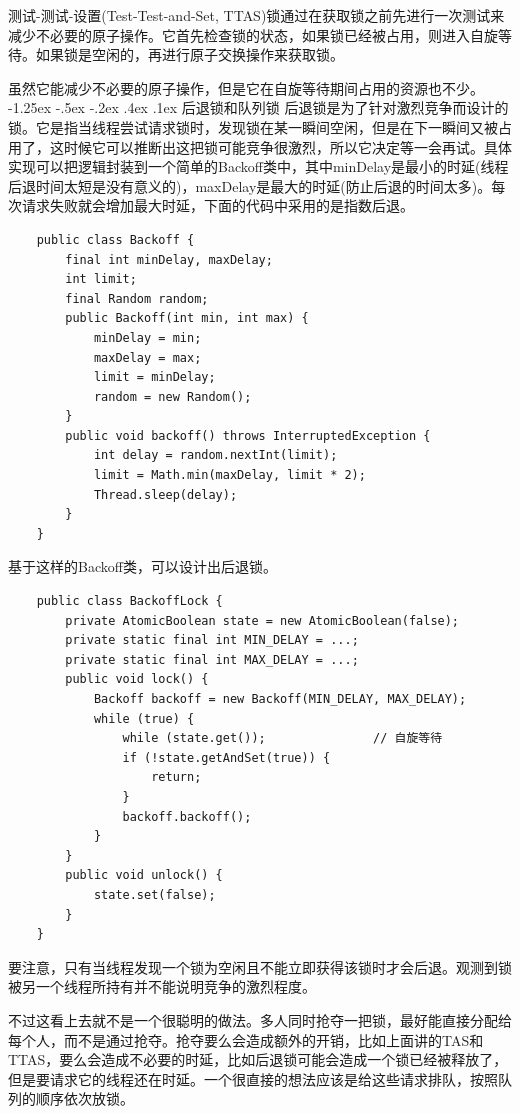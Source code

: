 \documentclass[a4paper, 11pt]{ctexart}
\makeatletter
\newcommand{\xiaosihao}{\fontsize{12pt}{\baselineskip}\selectfont}
\renewcommand\subsection{\@startsection{subsection}{1}{\z@}%
{-1.25ex \@plus -.5ex \@minus -.2ex}%
{.4ex \@plus .1ex}%
{\normalfont\xiaosihao\CJKfamily{hei}}}
\makeatother
\begin{document}
测试-测试-设置(Test-Test-and-Set, TTAS)锁通过在获取锁之前先进行一次测试来减少不必要的原子操作。它首先检查锁的状态，如果锁已经被占用，则进入自旋等待。如果锁是空闲的，再进行原子交换操作来获取锁。

虽然它能减少不必要的原子操作，但是它在自旋等待期间占用的资源也不少。
\subsection{后退锁和队列锁}
后退锁是为了针对激烈竞争而设计的锁。它是指当线程尝试请求锁时，发现锁在某一瞬间空闲，但是在下一瞬间又被占用了，这时候它可以推断出这把锁可能竞争很激烈，所以它决定等一会再试。具体实现可以把逻辑封装到一个简单的Backoff类中，其中minDelay是最小的时延(线程后退时间太短是没有意义的)，maxDelay是最大的时延(防止后退的时间太多)。每次请求失败就会增加最大时延，下面的代码中采用的是指数后退。
\begin{lstlisting}
    public class Backoff {
        final int minDelay, maxDelay;
        int limit;
        final Random random;
        public Backoff(int min, int max) {
            minDelay = min;
            maxDelay = max;
            limit = minDelay;
            random = new Random();
        }
        public void backoff() throws InterruptedException {
            int delay = random.nextInt(limit);
            limit = Math.min(maxDelay, limit * 2);
            Thread.sleep(delay);
        }
    }
\end{lstlisting} 

基于这样的Backoff类，可以设计出后退锁。
\begin{lstlisting}
    public class BackoffLock {
        private AtomicBoolean state = new AtomicBoolean(false);
        private static final int MIN_DELAY = ...;
        private static final int MAX_DELAY = ...;
        public void lock() {
            Backoff backoff = new Backoff(MIN_DELAY, MAX_DELAY);
            while (true) {
                while (state.get());               // 自旋等待
                if (!state.getAndSet(true)) {
                    return;
                }
                backoff.backoff();
            }
        }
        public void unlock() {
            state.set(false);
        }
    }
\end{lstlisting}

要注意，只有当线程发现一个锁为空闲且不能立即获得该锁时才会后退。观测到锁被另一个线程所持有并不能说明竞争的激烈程度。

不过这看上去就不是一个很聪明的做法。多人同时抢夺一把锁，最好能直接分配给每个人，而不是通过抢夺。抢夺要么会造成额外的开销，比如上面讲的TAS和TTAS，要么会造成不必要的时延，比如后退锁可能会造成一个锁已经被释放了，但是要请求它的线程还在时延。一个很直接的想法应该是给这些请求排队，按照队列的顺序依次放锁。
\end{document}
